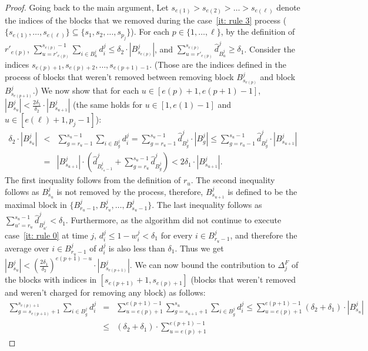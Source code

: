 \documentclass[11pt]{article}
\begin{document}
\begin{proof}
Going back to the main argument,
Let $s_{e(1)} > s_{e(2)}>\dots>s_{e(\ell)}$ denote the indices of the blocks
that we removed during the case~\ref{it: rule 3} process
($\{s_{e(1)},\dots,s_{e(\ell)}\}\subseteq\{s_1, s_2,\dots,s_{p_j}\}$).
For each $p\in \{1,\dots,\ell\}$, by the definition of $r'_{e(p)}$,
$\sum_{u=r'_{e(p)}}^{s_{e(p)}-1} \sum_{i\in B^j_u} d^j_i\le
\delta_2\cdot |B^j_{s_{e(p)}}|$,
and $\sum_{u=r'_{e(p)}}^{s_{e(p)}} \hat{d}^j_{B^j_u} \ge \delta_1$.
Consider the indices $s_{e(p)+1},s_{e(p)+2},\ldots,s_{e(p+1)-1}$. (Those
are the indices defined in the process of blocks that weren't removed
between removing block $B^j_{s_{e(p)}}$ and block $B^j_{s_{e(p+1)}}$.)
We now show that for each $u \in [e(p)+1,e(p+1)-1]$,
 $|B_{s_{u}}^j|< \frac{2\delta_1}{\delta_2}\cdot|B^j_{s_{u+1}}|$
(the same holds for $u\in[1,e(1)-1]$ and $u\in[e(\ell)+1,p_j-1]$):
\begin{eqnarray*}
\delta_2\cdot |B_{s_u}^j| &<& \sum_{g=r_u-1}^{s_u-1} \sum_{i \in B^j_g} d^j_i =
\sum_{g=r_u-1}^{s_u-1} \hat{d}^j_{B^j_{g}} \cdot|B^j_{g}|
\le \sum_{g=r_u-1}^{s_u-1} \hat{d}^j_{B^j_g} \cdot|B^j_{s_{u+1}}| \\
&=&|B^j_{s_{u+1}}|\cdot \left(\hat{d}^j_{B^j_{r_u-1}} +
\sum_{g=r_u}^{s_u-1} \hat{d}^j_{B^j_g}\right)
<  2\delta_1 \cdot |B^j_{s_{u+1}}|.
\end{eqnarray*}
The first inequality follows from the definition of $r_u$.
The second inequality follows as $B^j_{s_{u}}$ is not removed by
the process, therefore, $B^j_{s_{u+1}}$ is defined to be the
maximal block in $\{B^j_{r_u-1},B^j_{r_u},\ldots, B^j_{s_u-1}\} $.
The last inequality follows as
$\sum_{u'=r_u}^{s_u-1} \hat{d}^j_{B^j_{u'}} < \delta_1$.
Furthermore, as the algorithm did not continue to execute case~\ref{it: rule 0}
at time $j$,
$d^j_{i} \leq 1-w^j_{i}<\delta_1$ for every $i \in B^j_{r_u-1}$,
and therefore the average over $i \in B^j_{r_u-1}$ of $d^j_i$ is also
less than $\delta_1$.
Thus we get $|B_{s_{u}}^j|<
\left(\frac{2\delta_1}{\delta_2}\right)^{e(p+1)-u} \cdot|B^j_{s_{e(p+1)}}|$.
We can now bound the contribution to $\Delta_j^F$ of the blocks
with indices in $[s_{e(p+1)}+1,s_{e(p)+1}]$
(blocks that weren't removed and weren't
charged for removing any block) as follows:
\begin{eqnarray*}
\sum_{g=s_{e(p+1)}+1}^{s_{e(p)+1}} \sum _{i\in B_g^j} d_i^j &=&
\sum_ {u=e(p)+1}^{e(p+1)-1} \sum_{g=s_{u+1}+1}^{s_u} \sum _{i\in B_g^j} d_i^j
\le  \sum_ {u=e(p)+1}^{e(p+1)-1} (\delta_2+\delta_1)\cdot |B^j_{s_u}|\\
&\le &  (\delta_2+\delta_1)\cdot \sum_ {u=e(p)+1}^{e(p+1)-1}

\end{eqnarray*}
\end{proof}
\end{document}
